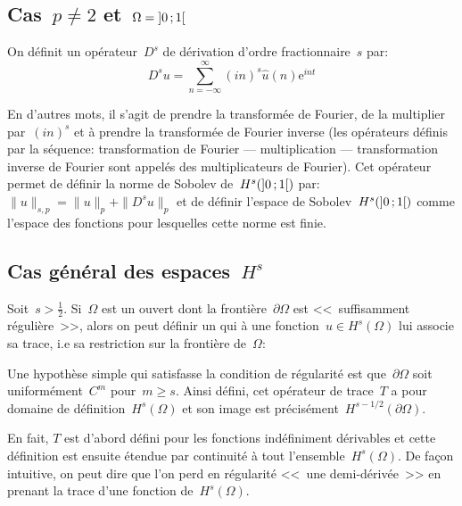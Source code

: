 \medskip
\subsection{Cas~$p\neq 2$ et~$\Omega = \mathopen{]}0\,;1\mathclose{[}$}

On définit un opérateur~$D^s$ de dérivation d'ordre fractionnaire~$s$ par:
\begin{equation}
D^{s}u=\sum_{n=-\infty}^\infty (in)^s\widehat{u}(n)\mathrm{e}^{int}
\end{equation}

En d'autres mots, il s'agit de prendre la transformée de Fourier, de la multiplier par~$(in)^s$ et
à prendre la transformée de Fourier inverse (les opérateurs définis par la séquence:
transformation de Fourier --- multiplication --- transformation inverse de Fourier sont appelés des
multiplicateurs de Fourier).
Cet opérateur permet de définir la norme de Sobolev de~$H^s(\mathopen{]}0\,;1\mathclose{[})$ par:
$\|u\|_{s,p}=\|u\|_p+\|D^s u\|_p$ et de définir l'espace de Sobolev~$H^s(\mathopen{]}0\,;1\mathclose{[})$
comme l'espace des fonctions pour lesquelles cette norme est finie.

\medskip
\subsection{Cas général des espaces~$H^s$}

Soit~$s > \frac{1}{2}$. Si~$\Omega$ est un ouvert dont la frontière~$\partial \Omega$ est
<<~suffisamment régulière~>>, alors on peut définir un 
qui à une fonction~$u \in H^{s}(\Omega)$ lui associe sa trace, i.e sa restriction sur la
frontière de~$\Omega$: 

Une hypothèse simple qui satisfasse la condition de régularité est que~$\partial \Omega$
soit uniformément~$C^m$ pour~$m \geqslant s$.
Ainsi défini, cet opérateur de trace~$T$ a pour domaine de définition~$H^s(\Omega)$ et
son image est précisément~$H^{s-1/2}(\partial \Omega)$.

En fait, $T$ est d'abord défini pour les fonctions indéfiniment dérivables et cette définition
est ensuite étendue par continuité à tout l'ensemble~$H^s(\Omega)$.
De façon intuitive, on peut dire que l'on perd en régularité <<~une demi-dérivée~>> en prenant
la trace d'une fonction de~$H^s(\Omega)$.


